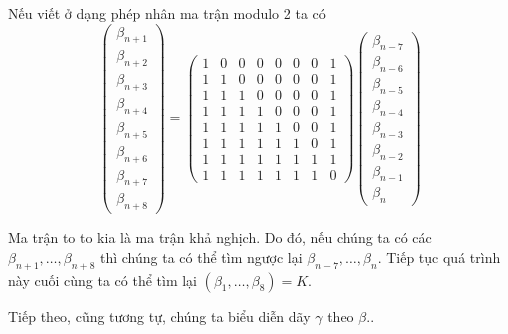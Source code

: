 Nếu viết ở dạng phép nhân ma trận modulo 2 ta có
\begin{equation*}
    \begin{pmatrix}
        \beta_{n+1} \\ \beta_{n+2} \\ \beta_{n+3} \\ \beta_{n+4} \\ \beta_{n+5} \\ \beta_{n+6} \\ \beta_{n+7} \\ \beta_{n+8}
    \end{pmatrix} = \begin{pmatrix}
        1 & 0 & 0 & 0 & 0 & 0 & 0 & 1 \\
        1 & 1 & 0 & 0 & 0 & 0 & 0 & 1 \\
        1 & 1 & 1 & 0 & 0 & 0 & 0 & 1 \\
        1 & 1 & 1 & 1 & 0 & 0 & 0 & 1 \\
        1 & 1 & 1 & 1 & 1 & 0 & 0 & 1 \\
        1 & 1 & 1 & 1 & 1 & 1 & 0 & 1 \\
        1 & 1 & 1 & 1 & 1 & 1 & 1 & 1 \\
        1 & 1 & 1 & 1 & 1 & 1 & 1 & 0
    \end{pmatrix} \begin{pmatrix}
        \beta_{n-7} \\ \beta_{n-6} \\ \beta_{n-5} \\ \beta_{n-4} \\ \beta_{n-3} \\ \beta_{n-2} \\ \beta_{n-1} \\ \beta_n
    \end{pmatrix}
\end{equation*}

Ma trận to to kia là ma trận khả nghịch. Do đó, nếu chúng ta có các $\beta_{n+1}, \ldots, \beta_{n+8}$ thì chúng ta có thể tìm ngược lại $\beta_{n-7}, \ldots, \beta_n$. Tiếp tục quá trình này cuối cùng ta có thể tìm lại $(\beta_1, \ldots, \beta_8) = K$.

Tiếp theo, cũng tương tự, chúng ta biểu diễn dãy $\gamma$ theo $\beta$..

